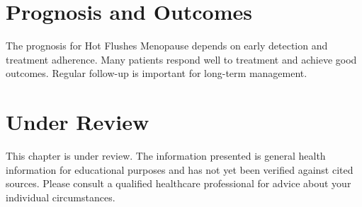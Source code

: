 \section*{Prognosis and Outcomes}
The prognosis for Hot Flushes Menopause depends on early detection and treatment adherence. Many patients respond well to treatment and achieve good outcomes. Regular follow-up is important for long-term management.
\section*{Under Review}
This chapter is under review. The information presented is general health information for educational purposes and has not yet been verified against cited sources. Please consult a qualified healthcare professional for advice about your individual circumstances.


\clearpage
